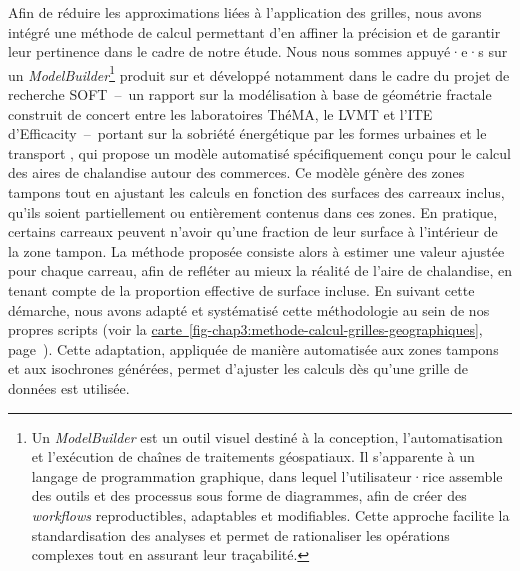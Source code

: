 \begin{refsegment}
Afin de réduire les approximations liées à l'application des grilles, nous avons intégré une méthode de calcul permettant d’en affiner la précision et de garantir leur pertinence dans le cadre de notre étude. Nous nous sommes appuyé·e·s sur un \textsl{ModelBuilder}\footnote{
    Un \textsl{ModelBuilder} est un outil visuel destiné à la conception, l’automatisation et l’exécution de chaînes de traitements géospatiaux. Il s’apparente à un langage de programmation graphique, dans lequel l’utilisateur·rice assemble des outils et des processus sous forme de diagrammes, afin de créer des \textsl{workflows} reproductibles, adaptables et modifiables. Cette approche facilite la standardisation des analyses et permet de rationaliser les opérations complexes tout en assurant leur traçabilité.
} produit sur  et développé notamment dans le cadre du projet de recherche SOFT~–~un rapport sur la modélisation à base de géométrie fractale construit de concert entre les laboratoires \acrfull{ThéMA}, le \acrfull{LVMT} et l'\acrfull{ITE} d'Efficacity~–~portant sur la sobriété énergétique par les formes urbaines et le transport \textcolor{blue}{\autocite[123]{bonin_projet_2020}}, qui propose un modèle automatisé spécifiquement conçu pour le calcul des aires de chalandise autour des commerces. Ce modèle génère des zones tampons tout en ajustant les calculs en fonction des surfaces des carreaux inclus, qu’ils soient partiellement ou entièrement contenus dans ces zones. En pratique, certains carreaux peuvent n’avoir qu’une fraction de leur surface à l’intérieur de la zone tampon. La méthode proposée consiste alors à estimer une valeur ajustée pour chaque carreau, afin de refléter au mieux la réalité de l’aire de chalandise, en tenant compte de la proportion effective de surface incluse. En suivant cette démarche, nous avons adapté et systématisé cette méthodologie au sein de nos propres scripts (voir la \hyperref[fig-chap3:methode-calcul-grilles-geographiques]{carte~\ref{fig-chap3:methode-calcul-grilles-geographiques}}, page~\pageref{fig-chap3:methode-calcul-grilles-geographiques}). Cette adaptation, appliquée de manière automatisée aux zones tampons et aux isochrones générées, permet d’ajuster les calculs dès qu’une grille de données est utilisée.%


\end{refsegment}
